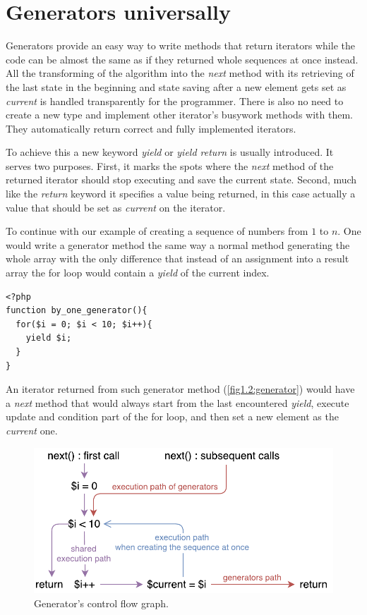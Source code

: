 \section{Generators universally}

Generators provide an easy way to write methods that return iterators while the code can be almost the same as if they returned whole sequences at once instead. All the transforming of the algorithm into the \emph{next} method with its retrieving of the last state in the beginning and state saving after a new element gets set as \emph{current} is handled transparently for the programmer. There is also no need to create a new type and implement other iterator’s busywork methods with them. They automatically return correct and fully implemented iterators.

To achieve this a new keyword \emph{yield} or \emph{yield return} is usually introduced. It serves two purposes. First, it marks the spots where the \emph{next} method of the returned iterator should stop executing and save the current state. Second, much like the \emph{return} keyword it specifies a value being returned, in this case actually a value that should be set as \emph{current} on the iterator.

To continue with our example of creating a sequence of numbers from $1$ to $n$. One would write a generator method the same way a normal method generating the whole array with the only difference that instead of an assignment into a result array the for loop would contain a \emph{yield} of the current index. 

\begin{verbatim}
<?php
function by_one_generator(){
  for($i = 0; $i < 10; $i++){
    yield $i;
  }
}
\end{verbatim}

An iterator returned from such generator method (\autoref{fig1.2:generator}) would have a \emph{next} method that would always start from the last encountered \emph{yield}, execute update and condition part of the for loop, and then set a new element as the \emph{current} one.

\begin{figure}[h]
	\centering	
	\includegraphics[scale=0.75]{../img/1_2_generators}	
	\caption{Generator's control flow graph.}
	\label{fig1.2:generator}
\end{figure}

